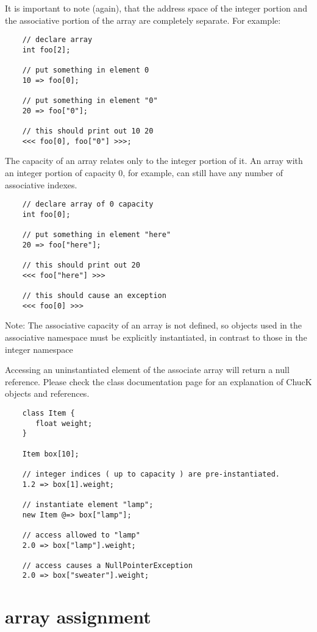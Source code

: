 It is important to note (again), that the address space of the integer portion and the associative portion of the array are completely separate. For example:
\begin{verbatim}
    // declare array
    int foo[2];

    // put something in element 0
    10 => foo[0];

    // put something in element "0"
    20 => foo["0"];

    // this should print out 10 20
    <<< foo[0], foo["0"] >>>;
\end{verbatim}

The capacity of an array relates only to the integer portion of it. An array with an integer portion of capacity 0, for example, can still have any number of associative indexes.
\begin{verbatim}
    // declare array of 0 capacity
    int foo[0];

    // put something in element "here"
    20 => foo["here"];

    // this should print out 20
    <<< foo["here"] >>>

    // this should cause an exception
    <<< foo[0] >>>
\end{verbatim}

Note: The associative capacity of an array is not defined, so objects used in the associative namespace must be explicitly instantiated, in contrast to those in the integer namespace

 Accessing an uninstantiated element of the associate array will return a null reference. Please check the class documentation page for an explanation of ChucK objects and references.
\begin{verbatim}
    class Item { 
       float weight; 
    }
    
    Item box[10]; 

    // integer indices ( up to capacity ) are pre-instantiated.
    1.2 => box[1].weight; 

    // instantiate element "lamp";
    new Item @=> box["lamp"]; 

    // access allowed to "lamp"
    2.0 => box["lamp"].weight; 

    // access causes a NullPointerException    
    2.0 => box["sweater"].weight; 
\end{verbatim}
 

\section{array assignment}

